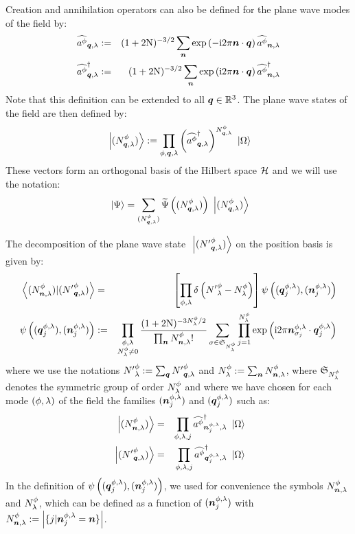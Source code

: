 \documentclass[10pt,a4paper,twoside,openany]{book}
\begin{document}
Creation and annihilation operators can also be defined for the plane wave modes of the field by:
\begin{eqnarray*}
\aop \pt \q \sp & \eqdef & (1+2 \N)^{-3/2} \sum_{\n} \exp{-\i 2 \pi \n \ssp \q} \aop \pt \n \sp \\
\cop \pt \q \sp & \eqdef & (1+2 \N)^{-3/2} \sum_{\n} \exp{\i 2 \pi \n \ssp \q} \cop \pt \n \sp
\end{eqnarray*}
Note that this definition can be extended to all $\q \in \IR^3$. The plane wave states of the field are then defined by:
\begin{equation*}
\ket{\bFQ N \pt \q \sp} \eqdef \prod_{\pt,\q,\sp} \left( \cop \pt \q \sp \right)^{\bQ N \pt \q \sp} \ket{\vac}
\end{equation*}
These vectors form an orthogonal basis of the Hilbert space $\H$ and we will use the notation:
\begin{equation*}
\ket\Psi = \sum_{\bFQ N \pt \q \sp} \FT\Psi \left( \bFQ N \pt \q \sp \right) \ket{\bFQ N \pt \q \sp}
\end{equation*}

The decomposition of the plane wave state $\ket{\bFQ {N'} \pt \q \sp}$ on the position basis is given by:
\begin{eqnarray*}
\braket{\bFX N \pt \n \sp}{\bFQ {N'} \pt \q \sp} & = & \left[ \prod_{\pt, \sp} \delta\left( {N'}^\pt_\sp - N^\pt_\sp \right) \right] \psi \left( ( \q^{\pt, \sp}_j ), ( \n^{\pt, \sp}_j ) \right) \\
\psi \left( ( \q^{\pt, \sp}_j ), ( \n^{\pt, \sp}_j ) \right) & \eqdef & \prod_{\substack{\pt, \sp \\ N^\pt_\sp \neq 0}} \frac{(1+2 \N)^{-3 N^\pt_\sp / 2} }{\prod_{\n} \bX N \pt \n \sp !} \sum_{\sigma \in \mathfrak{S}_{N^\pt_\sp}} \prod_{j = 1}^{N^\pt_\sp} \exp{\i 2 \pi \n^{\pt, \sp}_{\sigma_j} \ssp \q^{\pt, \sp}_j}
\end{eqnarray*}
where we use the notations ${N'}^\pt_\sp \eqdef \sum_{\q} \bQ {N'} \pt \q \sp$ and $N^\pt_\sp \eqdef \sum_{\n} \bX N \pt \n \sp$, where $\mathfrak{S}_{N^\pt_\sp}$ denotes the symmetric group of order $N^\pt_\sp$ and where we have chosen for each mode $( \pt, \sp )$ of the field the families $( \n^{\pt, \sp}_j )$ and $( \q^{\pt, \sp}_j )$ such as:
\begin{eqnarray*}
\ket{\bFX N \pt \n \sp} & = & \prod_{\pt, \sp, j} \cop \pt {\n^{\pt, \sp}_j} \sp \ket{\vac} \\
\ket{\bFQ {N'} \pt \q \sp} & = & \prod_{\pt, \sp, j} \cop \pt {\q^{\pt, \sp}_j} \sp \ket{\vac}
\end{eqnarray*}
In the definition of $\psi \left( ( \q^{\pt, \sp}_j ), ( \n^{\pt, \sp}_j ) \right)$, we used for convenience the symbols $\bX N \pt \n \sp$ and $N^\pt_\sp$, which can be defined as a function of $( \n^{\pt, \sp}_j )$ with $\bX N \pt \n \sp \eqdef \left|  \{ j | \n^{\pt, \sp}_j = \n \} \right|$.
\end{document}
